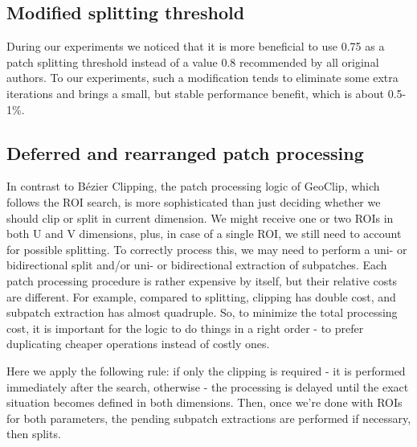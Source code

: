 \documentclass{jcgt}
\begin{document}
\subsection{Modified splitting threshold}
During our experiments we noticed that it is more beneficial to use 0.75 as a patch splitting threshold instead of a value 0.8 recommended by all original authors. To our experiments, such a modification tends to eliminate some extra iterations and brings a small, but stable performance benefit, which is about 0.5-1\%.

\subsection{Deferred and rearranged patch processing}
In contrast to Bézier Clipping, the patch processing logic of GeoClip, which follows the ROI search, is more sophisticated than just deciding whether we should clip or split in current dimension. We might receive one or two ROIs in both U and V dimensions, plus, in case of a single ROI, we still need to account for possible splitting. To correctly process this, we may need to perform a uni- or bidirectional split and/or uni- or bidirectional extraction of subpatches.
Each patch processing procedure is rather expensive by itself, but their relative costs are different. For example, compared to splitting, clipping has double cost, and subpatch extraction has almost quadruple. So, to minimize the total processing cost, it is important for the logic to do things in a right order - to prefer duplicating cheaper operations instead of costly ones.

Here we apply the following rule: if only the clipping is required - it is performed immediately after the search, otherwise - the processing is delayed until the exact situation becomes defined in both dimensions. Then, once we're done with ROIs for both parameters, the pending subpatch extractions are performed if necessary, then splits.
\end{document}
